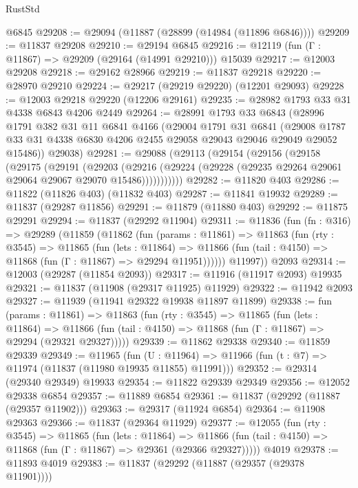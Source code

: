 \begin{lexlean}{RustStd}
\begin{coremodule}
{\begin{coremodule}
{{{{{{{{{{{{{{{{{{{{{{{{{{{{{{{{{{{{{{{{{{{{{{{{{{    @6845
@29208 := @29094 (@11887 (@28899 (@14984 (@11896 @6846))))
@29209 := @11837 @29208
@29210 := @29194 @6845
@29216 := @12119 (fun (Γ : @11867) => @29209 (@29164 (@14991 @29210))) @15039
@29217 := @12003 @29208
@29218 := @29162 @28966
@29219 := @11837 @29218
@29220 := @28970 @29210
@29224 := @29217 (@29219 @29220) (@12201 @29093)
@29228 := @12003 @29218 @29220 (@12206 @29161)
@29235 := @28982 @1793 @33 @31 @4338 @6843 @4206 @2449
@29264 := @28991
    @1793
    @33
    @6843
    (@28996
      @1791
      @382
      @31
      @11
      @6841
      @4166
      (@29004
        @1791
        @31
        @6841
        (@29008 @1787 @33 @31 @4338 @6830 @4206 @2455 @29058 @29043 @29046 @29049 @29052 @15486))
      @29038)
@29281 := @29088
    (@29113
      (@29154
        (@29156
          (@29158
            (@29175
              (@29191
                (@29203
                  (@29216
                    (@29224 (@29228 (@29235 @29264 @29061 @29064 @29067 @29070 @15486)))))))))))
@29282 := @11820 @403
@29286 := @11822 (@11826 @403) (@11832 @403)
@29287 := @11841 @19932
@29289 := @11837 (@29287 @11856)
@29291 := @11879 (@11880 @403)
@29292 := @11875 @29291
@29294 := @11837 (@29292 @11904)
@29311 := @11836
    (fun (fn : @316) =>
    @29289
      (@11859
        (@11862
          (fun (params : @11861) =>
          @11863
            (fun (rty : @3545) =>
            @11865
              (fun (lets : @11864) =>
              @11866 (fun (tail : @4150) => @11868 (fun (Γ : @11867) => @29294 @11951))))))
        @11997))
    @2093
@29314 := @12003 (@29287 (@11854 @2093))
@29317 := @11916 (@11917 @2093) @19935
@29321 := @11837 (@11908 (@29317 @11925) @11929)
@29322 := @11942 @2093
@29327 := @11939 (@11941 @29322 @19938 @11897 @11899)
@29338 := fun (params : @11861) =>
  @11863
    (fun (rty : @3545) =>
    @11865
      (fun (lets : @11864) =>
      @11866 (fun (tail : @4150) => @11868 (fun (Γ : @11867) => @29294 (@29321 @29327)))))
@29339 := @11862 @29338
@29340 := @11859 @29339
@29349 := @11965
    (fun (U : @11964) => @11966 (fun (t : @7) => @11974 (@11837 (@11980 @19935 @11855) @11991)))
@29352 := @29314 (@29340 @29349) @19933
@29354 := @11822 @29339 @29349
@29356 := @12052 @29338 @6854
@29357 := @11889 @6854
@29361 := @11837 (@29292 (@11887 (@29357 @11902)))
@29363 := @29317 (@11924 @6854)
@29364 := @11908 @29363
@29366 := @11837 (@29364 @11929)
@29377 := @12055
    (fun (rty : @3545) =>
    @11865
      (fun (lets : @11864) =>
      @11866 (fun (tail : @4150) => @11868 (fun (Γ : @11867) => @29361 (@29366 @29327)))))
    @4019
@29378 := @11893 @4019
@29383 := @11837 (@29292 (@11887 (@29357 (@29378 @11901))))
}}}}}}}}}}}}}}}}}}}}}}}}}}}}}}}}}}}}}}}}}}}}}}}}}}
\end{coremodule}}
\end{coremodule}
\end{lexlean}
